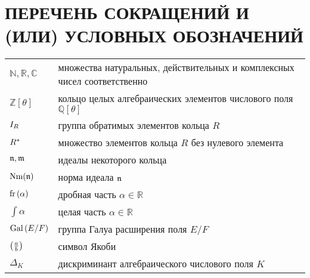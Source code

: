 \documentclass[_00_dissertation.tex]{subfiles}
\begin{document}
\onlyinsubfile{
    \renewcommand{\contentsname}{ОГЛАВЛЕНИЕ}
    \setcounter{tocdepth}{3}
    \tableofcontents
}

\chapter*{ПЕРЕЧЕНЬ СОКРАЩЕНИЙ И (ИЛИ) УСЛОВНЫХ ОБОЗНАЧЕНИЙ}

\begin{longtable}{p{}p{}}
    $\mathbb{N}, \mathbb{R}, \mathbb{C}$ & множества натуральных, действительных и
комплексных чисел соответственно\\

    $\mathbb{Z}[\theta]$ & кольцо целых алгебраических элементов числового поля $\mathbb{Q}[\theta]$\\

    $I_{R}$ & группа обратимых элементов кольца $R$\\

    $R^{*}$ & множество элементов кольца $R$ без нулевого элемента\\

    $\mathfrak{n}, \mathfrak{m}$ & идеалы некоторого кольца\\

    $\textrm{Nm}(\mathfrak{n})$ & норма идеала $\mathfrak{n}$\\

    $\textrm{fr}\left(\alpha\right)$ & дробная часть $\alpha \in \mathbb{R}$\\

    $\int{\alpha}$ & целая часть $\alpha \in \mathbb{R}$\\

    $\textrm{Gal}\left(E/F\right)$ & группа Галуа расширения поля $E/F$\\

    $\left(\frac{a}{b}\right)$ & символ Якоби\\

    $\Delta_{K}$ & дискриминант алгебраического числового поля $K$\\

\end{longtable}
\end{document}
